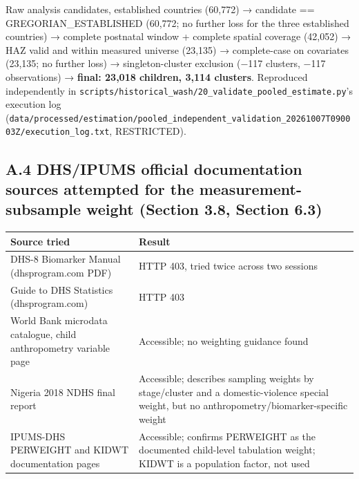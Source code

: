 Raw analysis candidates, established countries (60,772) → candidate == GREGORIAN\_ESTABLISHED (60,772; no further loss for the three established countries) → complete postnatal window + complete spatial coverage (42,052) → HAZ valid and within measured universe (23,135) → complete-case on covariates (23,135; no further loss) → singleton-cluster exclusion (−117 clusters, −117 observations) → \textbf{final: 23,018 children, 3,114 clusters}. Reproduced independently in \texttt{scripts/\allowbreak{}historical\_\allowbreak{}wash/\allowbreak{}20\_\allowbreak{}validate\_\allowbreak{}pooled\_\allowbreak{}estimate.\allowbreak{}py}'s execution log (\texttt{data/\allowbreak{}processed/\allowbreak{}estimation/\allowbreak{}pooled\_\allowbreak{}independent\_\allowbreak{}validation\_\allowbreak{}20261007T090003Z/\allowbreak{}execution\_\allowbreak{}log.\allowbreak{}txt}, RESTRICTED).

\subsection*{A.4 DHS/IPUMS official documentation sources attempted for the measurement-subsample weight (Section 3.8, Section 6.3)}

\begingroup\fontsize{10}{15}\selectfont\setlength{\tabcolsep}{3pt}
\begin{longtable}{>{\raggedright\arraybackslash}p{4.41cm}>{\raggedright\arraybackslash}p{9.65cm}}
\toprule
Source tried & Result \\
\midrule
\endhead
DHS-8 Biomarker Manual (dhsprogram.com PDF) & HTTP 403, tried twice across two sessions \\
Guide to DHS Statistics (dhsprogram.com) & HTTP 403 \\
World Bank microdata catalogue, child anthropometry variable page & Accessible; no weighting guidance found \\
Nigeria 2018 NDHS final report & Accessible; describes sampling weights by stage/cluster and a domestic-violence special weight, but no anthropometry/biomarker-specific weight \\
IPUMS-DHS PERWEIGHT and KIDWT documentation pages & Accessible; confirms PERWEIGHT as the documented child-level tabulation weight; KIDWT is a population factor, not used \\
\bottomrule
\end{longtable}
\endgroup

